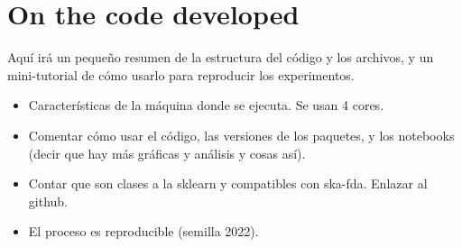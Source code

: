 %
%

\chapter{On the code developed}\label{ch:code}

\begin{outcomment}
  Aquí irá un pequeño resumen de la estructura del código y los archivos, y un mini-tutorial de cómo usarlo para reproducir los experimentos.

  \begin{itemize}
    \item Características de la máquina donde se ejecuta. Se usan 4 cores.
    \item  Comentar cómo usar el código, las versiones de los paquetes, y los notebooks (decir que hay más gráficas y análisis y cosas así).
    \item Contar que son clases a la sklearn y compatibles con ska-fda. Enlazar al github.
    \item El proceso es reproducible (semilla 2022).
  \end{itemize}
\end{outcomment}
